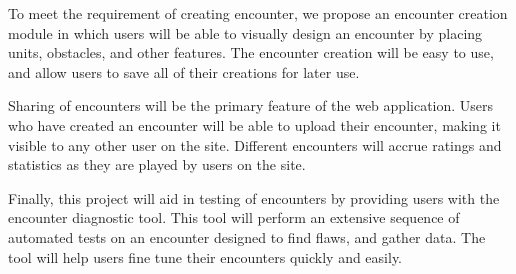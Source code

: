 \documentclass[12pt,a4paper]{report}
\begin{document}
To meet the requirement of creating encounter, we propose an encounter creation module in which users will be able to visually design an encounter by placing units, obstacles, and other features. The encounter creation will be easy to use, and allow users to save all of their creations for later use. 

Sharing of encounters will be the primary feature of the web application. Users who have created an encounter will be able to upload their encounter, making it visible to any other user on the site. Different encounters will accrue ratings and statistics as they are played by users on the site. 

Finally, this project will aid in testing of encounters by providing users with the encounter diagnostic tool. This tool will perform an extensive sequence of automated tests on an encounter designed to find flaws, and gather data. The tool will help users fine tune their encounters quickly and easily. 


		
\newpage
{}
\listoffigures

\newpage
{}
\listoftables

\newpage
{}


\end{document}
